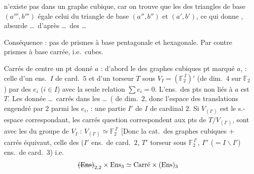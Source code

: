 \documentclass[11pt,a4paper]{article}
\begin{document}
n'existe pas dans un graphe cubique, car on trouve que les   des triangles de base $(a''', b''')$ égale celui du triangle de base $(a'', b'')$ et $(a', b')$, ce qui donne , absurde \ldots\ d'après \ldots\ des  \ldots

Conséquence : pas de prismes à base pentagonale et hexagonale. Par contre \ill{} prismes à base carrée, i.e.\ cubes.


Carrés de centre un pt donné $a$ : d'abord le  des graphes cubiques  pt marqué $a$,  : celle d'un ens.\ $I$ de card.\ $5$ et d'un torseur $T$ sous $V_I = (\mathbb{F}_2^{\,I})'$ (de dim.\ $4$ sur $\mathbb{F}_2$)  par des $e_i$ ($i \in I$) avec la seule relation $\sum e_i = 0$. L'ens.\ des pts non liés à $a$ est $T$. Les donnée \ldots\ carrés dans les  \ldots\ ( de dim.\ $2$, donc l'espace des translations engendré par $2$ parmi les $e_i$, \struck{\ill{}}  : une partie $I'$ de $I$ de cardinal $2$. Si $V_{(I')}$ est le s.-espace correspondant, les carrés  question correspondent aux pts de $T/V_{(I')}$,  sont   avec les  du groupe  de $V_I$ : $V_{(I')} \simeq \mathbb{F}_2^{\,I'}$ [Donc la cat.\ des graphes cubiques $+$ carrés équivaut, celle des   \struck{(\ldots)} ($I'$ ens.\ de card.\ $2$, $T'$ torseur sous $\mathbb{F}_2^{\,I'}$, $I''$ ($= I \smallsetminus I'$) ens.\ de card.\ $3$) i.e.
\[
\text{\struck{$(\mathrm{Ens})$}}_{2,2} \times \mathrm{Ens}_3 \simeq \text{Carré} \times (\mathrm{Ens})_3
\]
\end{document}
